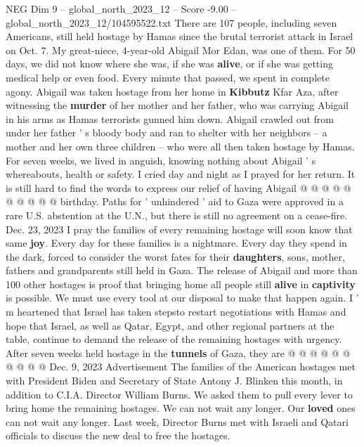 \begin{textsample}{NEG Dim 9 – global\_north\_2023\_12 – Score -9.00 – global\_north\_2023\_12/104595522.txt}  \label{ex:f9_neg_073}
There are 107 people, including seven Americans, still held hostage by Hamas since the brutal terrorist attack in Israel on Oct. 7.
My great-niece, 4-year-old Abigail Mor Edan, was one of them.
For 50 days, we did not know where she was, if she was \textbf{alive}, or if she was getting medical help or even food.
Every minute that passed, we spent in complete agony.
Abigail was taken hostage from her home in \textbf{Kibbutz} Kfar Aza, after witnessing the \textbf{murder} of her mother and her father, who was carrying Abigail in his arms as Hamas terrorists gunned him down.
Abigail crawled out from under her father ' s bloody body and ran to shelter with her neighbors -- a mother and her own three children -- who were all then taken hostage by Hamas.
For seven weeks, we lived in anguish, knowing nothing about Abigail ' s whereabouts, health or safety.
I cried day and night as I prayed for her return.
It is still hard to find the words to express our relief of having Abigail @ @ @ @ @ @ @ @ @ @ birthday.
Paths for ' unhindered ' aid to Gaza were approved in a rare U.S. abstention at the U.N., but there is still no agreement on a cease-fire.
Dec. 23, 2023 I pray the families of every remaining hostage will soon know that same \textbf{joy}.
Every day for these families is a nightmare.
Every day they spend in the dark, forced to consider the worst fates for their \textbf{daughters}, sons, mother, fathers and grandparents still held in Gaza.
The release of Abigail and more than 100 other hostages is proof that bringing home all people still \textbf{alive} in \textbf{captivity} is possible.
We must use every tool at our disposal to make that happen again.
I ' m heartened that Israel has taken stepsto restart negotiations with Hamas and hope that Israel, as well as Qatar, Egypt, and other regional partners at the table, continue to demand the release of the remaining hostages with urgency.
After seven weeks held hostage in the \textbf{tunnels} of Gaza, they are @ @ @ @ @ @ @ @ @ @ Dec. 9, 2023 Advertisement The families of the American hostages met with President Biden and Secretary of State Antony J.
Blinken this month, in addition to C.I.A.
Director William Burns.
We asked them to pull every lever to bring home the remaining hostages.
We can not wait any longer.
Our \textbf{loved} ones can not wait any longer.
Last week, Director Burns met with Israeli and Qatari officials to discuss the new deal to free the hostages.

\end{textsample}
